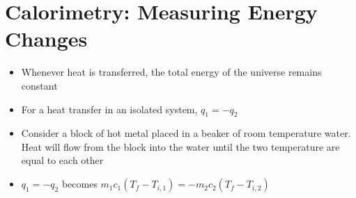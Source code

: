 \documentclass[12pt, openany, letterpaper]{memoir}
\begin{document}
\section{Calorimetry: Measuring Energy Changes}
\begin{itemize}
	\item Whenever heat is transferred, the total energy of the universe remains constant
	\item For a heat transfer in an isolated system, $q_1=-q_2$
	\item Consider a block of hot metal placed in a beaker of room temperature water. Heat will flow from the block into the water until the two temperature are equal to each other
	\item $q_1=-q_2$ becomes $m_1c_1\left(T_f-T_{i,1}\right)=-m_2c_2\left(T_f-T_{i,2}\right)$


\end{itemize}
\end{document}
